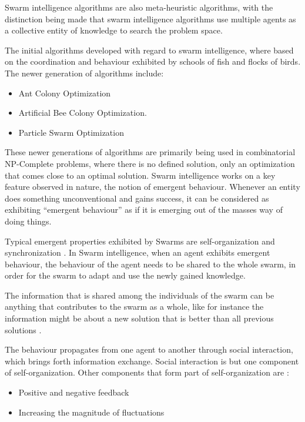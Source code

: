 Swarm intelligence algorithms are also meta-heuristic algorithms, with the distinction being made that swarm intelligence algorithms use multiple agents as a collective entity of knowledge to search the problem space\cite{SwarmArt,ChaoticSwarmIntel,BeeJobShop,CompuIntelligenceIntro,FundamentalSwarm}.

The initial algorithms developed with regard to swarm intelligence, where based on the coordination and behaviour exhibited by schools of fish and flocks of birds. The newer generation of algorithms include\cite{SwarmArt,ChaoticSwarmIntel,BeeJobShop}:
\begin{itemize}
\item Ant Colony Optimization
\item Artificial Bee Colony Optimization.
\item Particle Swarm Optimization 
\end{itemize}

These newer generations of algorithms are primarily being used in combinatorial NP-Complete problems, where there is no defined solution, only an optimization that comes close to an optimal solution. Swarm intelligence works on a key feature observed in nature, the notion of emergent behaviour\cite{SwarmArt,CompuIntelligenceIntro,FundamentalSwarm}. Whenever an entity does something unconventional and gains success, it can be considered as exhibiting “emergent behaviour” as if it is emerging out of the masses way of doing things\cite{SwarmArt,CompuIntelligenceIntro,FundamentalSwarm}. 

Typical emergent properties exhibited by Swarms are self-organization and synchronization \cite{SwarmArt}. In Swarm intelligence, when an agent exhibits emergent behaviour, the behaviour of the agent needs to be shared to the whole swarm, in order for the swarm to adapt and use the newly gained knowledge\cite{SwarmArt,ChaoticSwarmIntel,CompuIntelligenceIntro,FundamentalSwarm}.

The information that is shared among the individuals of the swarm can be anything that contributes to the swarm as a whole, like for instance the information might be about a new solution that is better than all previous solutions \cite{SwarmArt,ChaoticSwarmIntel,CompuIntelligenceIntro,FundamentalSwarm}. 

The behaviour propagates from one agent to another through social interaction, which brings forth information exchange\cite{SwarmArt}. Social interaction is but one component of self-organization. Other components that form part of self-organization are \cite{SwarmArt}:
\begin{itemize}
\item Positive and negative feedback
\item Increasing the magnitude of fluctuations
\end{itemize}

